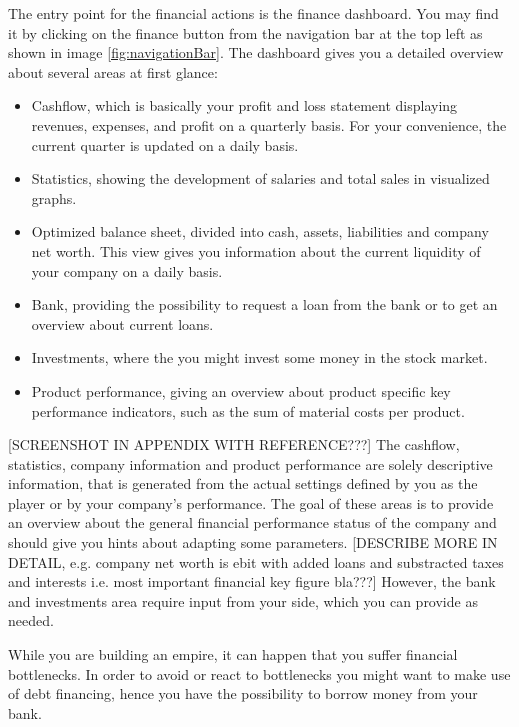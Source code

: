  The entry point for the financial actions is the finance dashboard. You may find it by clicking on the finance button from the navigation bar at the top left as shown in image \ref{fig:navigationBar}. The dashboard gives you a detailed overview about several areas at first glance:
\begin{itemize}
    \item Cashflow, which is basically your profit and loss statement displaying revenues, expenses, and profit on a quarterly basis. For your convenience, the current quarter is updated on a daily basis.
    \item Statistics, showing the development of salaries and total sales in visualized graphs.
    \item Optimized balance sheet, divided into cash, assets, liabilities and company net worth. This view gives you information about the current liquidity of your company on a daily basis.
    \item Bank, providing the possibility to request a loan from the bank or to get an overview about current loans.
    \item Investments, where the you might invest some money in the stock market.
    \item Product performance, giving an overview about product specific key performance indicators, such as the sum of material costs per product.
\end{itemize}
[SCREENSHOT IN APPENDIX WITH REFERENCE???] The cashflow, statistics, company information and product performance are solely descriptive information, that is generated from the actual settings defined by you as the player or by your company’s performance. The goal of these areas is to provide an overview about the general financial performance status of the company and should give you hints about adapting some parameters. [DESCRIBE MORE IN DETAIL, e.g. company net worth is ebit with added loans and substracted taxes and interests i.e. most important financial key figure bla???] However, the bank and investments area require input from your side, which you can provide as needed. 

While you are building an empire, it can happen that you suffer financial bottlenecks. In order to avoid or react to bottlenecks you might want to make use of debt financing, hence you have the possibility to borrow money from your bank. 

